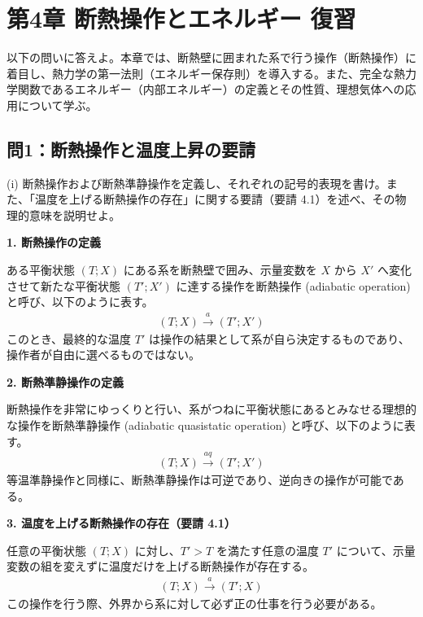 \documentclass[a4paper,12pt]{jlreq}
\begin{document}
\section*{第4章 断熱操作とエネルギー 復習}

以下の問いに答えよ。本章では、断熱壁に囲まれた系で行う操作（断熱操作）に着目し、熱力学の第一法則（エネルギー保存則）を導入する。また、完全な熱力学関数であるエネルギー（内部エネルギー）の定義とその性質、理想気体への応用について学ぶ。

\subsection*{問1：断熱操作と温度上昇の要請}

\begin{itembox}[l]{(i)}
  断熱操作および断熱準静操作を定義し、それぞれの記号的表現を書け。また、「温度を上げる断熱操作の存在」に関する要請（要請 4.1）を述べ、その物理的意味を説明せよ。
\end{itembox}

\vspace{5mm}

\par
\textbf{1. 断熱操作の定義} \par
ある平衡状態 $(T; X)$ にある系を断熱壁で囲み、示量変数を $X$ から $X'$ へ変化させて新たな平衡状態 $(T'; X')$ に達する操作を断熱操作 (adiabatic operation) と呼び、以下のように表す。
\begin{align}
  (T; X) \xrightarrow{a} (T'; X')
\end{align}
このとき、最終的な温度 $T'$ は操作の結果として系が自ら決定するものであり、操作者が自由に選べるものではない。

\textbf{2. 断熱準静操作の定義} \par
断熱操作を非常にゆっくりと行い、系がつねに平衡状態にあるとみなせる理想的な操作を断熱準静操作 (adiabatic quasistatic operation) と呼び、以下のように表す。
\begin{align}
  (T; X) \xrightarrow{aq} (T'; X')
\end{align}
等温準静操作と同様に、断熱準静操作は可逆であり、逆向きの操作が可能である。

\textbf{3. 温度を上げる断熱操作の存在（要請 4.1）} \par
任意の平衡状態 $(T; X)$ に対し、$T' > T$ を満たす任意の温度 $T'$ について、示量変数の組を変えずに温度だけを上げる断熱操作が存在する。
\begin{align}
  (T; X) \xrightarrow{a} (T'; X)
\end{align}
この操作を行う際、外界から系に対して必ず正の仕事を行う必要がある。
\end{document}
